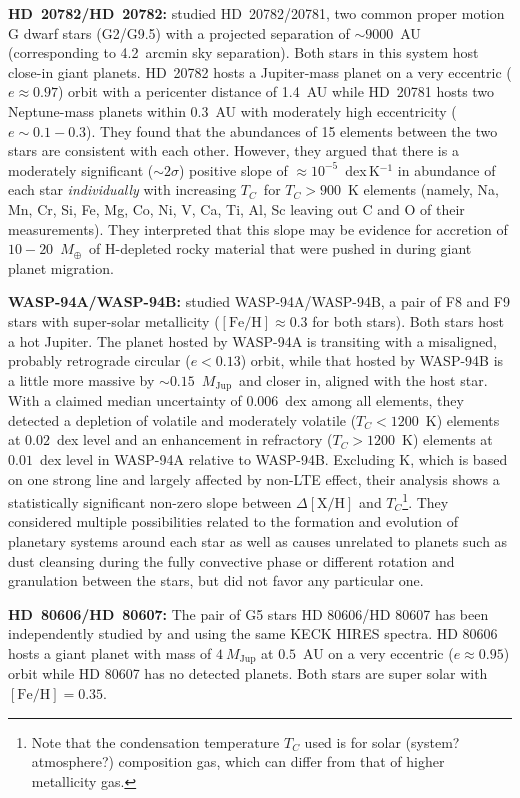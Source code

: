 \documentclass[manuscript]{aastex6}
\newcommand*\elem[1]{\ensuremath{\mathrm{#1}}}
\newcommand*\elemH[1]{\ensuremath{[\mathrm{#1}/\elem{H}]}}
\newcommand*{\feh}{\ensuremath{\elemH{Fe}}}
\newcommand{\Tcondens}{\ensuremath{T_C}}
\newcommand{\mearth}{\ensuremath{M_\oplus}}
\newcommand{\mjupiter}{\ensuremath{M_\mathrm{Jup}}}
\begin{document}
{\bf HD~20782/HD~20782:} 
\citealt{Mack:2014aa} studied HD~20782/20781, two common proper motion G dwarf stars (G2/G9.5)
with a projected separation of $\sim9000$~AU (corresponding to 4.2~arcmin sky separation).
Both stars in this system host close-in giant planets.
HD~20782 hosts a Jupiter-mass planet on a very eccentric ($e\approx 0.97$) orbit with a
pericenter distance of 1.4~AU while HD~20781 hosts two Neptune-mass planets within 0.3~AU
with moderately high eccentricity ($e\sim0.1-0.3$).
They found that the abundances of 15 elements between the two stars are consistent with each other.
However, they argued that there is a moderately significant ($\sim 2\sigma$)
positive slope of $\approx 10^{-5}$~dex\,K$^{-1}$ in abundance of each star
{\it individually} with increasing \Tcondens\ for $\Tcondens>900$~K elements
(namely, Na, Mn, Cr, Si, Fe, Mg, Co, Ni, V, Ca, Ti, Al, Sc leaving out C and O
of their measurements).
They interpreted that this slope may be evidence for accretion of $10-20$~\mearth\ of 
H-depleted rocky material that were pushed in during giant planet migration.

{\bf WASP-94A/WASP-94B:} 
\citealt{Teske:2016aa} studied WASP-94A/WASP-94B, a pair of F8 and F9 stars
with super-solar metallicity ($\feh\approx 0.3$ for both stars). Both stars
host a hot Jupiter.
The planet hosted by WASP-94A is transiting with a misaligned, probably
retrograde circular ($e<0.13$) orbit, while that hosted by WASP-94B is a little
more massive by $\sim 0.15$~\mjupiter\ and closer in, aligned with the host
star.
With a claimed median uncertainty of $0.006$~dex among all elements, they
detected a depletion of volatile and moderately volatile ($\Tcondens < 1200$~K)
elements at $0.02$~dex level and an enhancement in refractory ($\Tcondens >
1200$~K) elements at $0.01$~dex level in WASP-94A relative to WASP-94B.
Excluding K, which is based on one strong line and largely affected by non-LTE
effect, their analysis shows a statistically significant non-zero slope between
$\Delta\elemH{X}$ and $\Tcondens$\footnote{Note that the condensation
  temperature $\Tcondens$ used is for solar (system? atmosphere?) composition
  gas, which can differ from that of higher metallicity gas.}.
They considered multiple possibilities related to the formation and evolution
of planetary systems around each star as well as causes unrelated to planets
such as dust cleansing during the fully convective phase or different rotation
and granulation between the stars, but did not favor any particular one.

{\bf HD~80606/HD~80607:}
The pair of G5 stars HD 80606/HD 80607 has been independently studied by
\citealt{Saffe:2015aa} and \citealt{Mack:2016aa} using the same KECK HIRES
spectra. HD 80606 hosts a giant planet with mass of $4~\mjupiter$ at $0.5$~AU
on a very eccentric ($e\approx0.95$) orbit while HD 80607 has no detected
planets.
Both stars are super solar with $\feh=0.35$.
\end{document}
